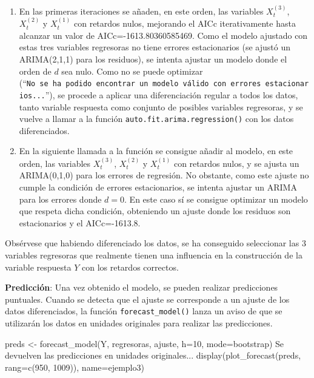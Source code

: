\documentclass[
  12pt,
  a4paper]{article}
\newenvironment{Shaded}{\begin{snugshade}}{\end{snugshade}}
\newcommand{\AttributeTok}[1]{\textcolor[rgb]{0.77,0.63,0.00}{#1}}
\newcommand{\DecValTok}[1]{\textcolor[rgb]{0.00,0.00,0.81}{#1}}
\newcommand{\FunctionTok}[1]{\textcolor[rgb]{0.00,0.00,0.00}{#1}}
\newcommand{\NormalTok}[1]{#1}
\newcommand{\OtherTok}[1]{\textcolor[rgb]{0.56,0.35,0.01}{#1}}
\newcommand{\StringTok}[1]{\textcolor[rgb]{0.31,0.60,0.02}{#1}}
\providecommand{\tightlist}{%
  \setlength{\itemsep}{0pt}\setlength{\parskip}{0pt}}
\begin{document}
\begin{enumerate}
\def\labelenumi{\arabic{enumi}.}
\tightlist
\item
  En las primeras iteraciones se añaden, en este orden, las variables
  \(X_t^{(3)}\), \(X_t^{(2)}\) y \(X_t^{(1)}\) con retardos nulos,
  mejorando el AICc iterativamente hasta alcanzar un valor de
  AICc=-1613.80360585469. Como el modelo ajustado con estas tres
  variables regresoras no tiene errores estacionarios (se ajustó un
  ARIMA(2,1,1) para los residuos), se intenta ajustar un modelo donde el
  orden de \(d\) sea nulo. Como no se puede optimizar
  (``\texttt{No\ se\ ha\ podido\ encontrar\ un\ modelo\ válido\ con\ errores\ estacionarios...}''),
  se procede a aplicar una diferenciación regular a todos los datos,
  tanto variable respuesta como conjunto de posibles variables
  regresoras, y se vuelve a llamar a la función
  \texttt{auto.fit.arima.regression()} con los datos diferenciados.
\item
  En la siguiente llamada a la función se consigue añadir al modelo, en
  este orden, las variables \(X_t^{(3)}\), \(X_t^{(2)}\) y \(X_t^{(1)}\)
  con retardos nulos, y se ajusta un ARIMA(0,1,0) para los errores de
  regresión. No obstante, como este ajuste no cumple la condición de
  errores estacionarios, se intenta ajustar un ARIMA para los errores
  donde \(d=0\). En este caso sí se consigue optimizar un modelo que
  respeta dicha condición, obteniendo un ajuste donde los residuos son
  estacionarios y el AICc=-1613.8.
\end{enumerate}

Obsérvese que habiendo diferenciado los datos, se ha conseguido
seleccionar las 3 variables regresoras que realmente tienen una
influencia en la construcción de la variable respuesta \(Y\) con los
retardos correctos.

\textbf{Predicción}: Una vez obtenido el modelo, se pueden realizar
predicciones puntuales. Cuando se detecta que el ajuste se corresponde a
un ajuste de los datos diferenciados, la función
\texttt{forecast\_model()} lanza un aviso de que se utilizarán los datos
en unidades originales para realizar las predicciones.

\begin{Shaded}
\begin{Highlighting}[]
\NormalTok{preds }\OtherTok{\textless{}{-}} \FunctionTok{forecast\_model}\NormalTok{(Y, regresoras, ajuste, }\AttributeTok{h=}\DecValTok{10}\NormalTok{, }\AttributeTok{mode=}\StringTok{\textquotesingle{}bootstrap\textquotesingle{}}\NormalTok{)}
\NormalTok{Se devuelven las predicciones en unidades originales...}
\FunctionTok{display}\NormalTok{(}\FunctionTok{plot\_forecast}\NormalTok{(preds, }\AttributeTok{rang=}\FunctionTok{c}\NormalTok{(}\DecValTok{950}\NormalTok{, }\DecValTok{1009}\NormalTok{)), }\AttributeTok{name=}\StringTok{\textquotesingle{}ejemplo3\textquotesingle{}}\NormalTok{)}
\end{Highlighting}
\end{Shaded}
\end{document}

